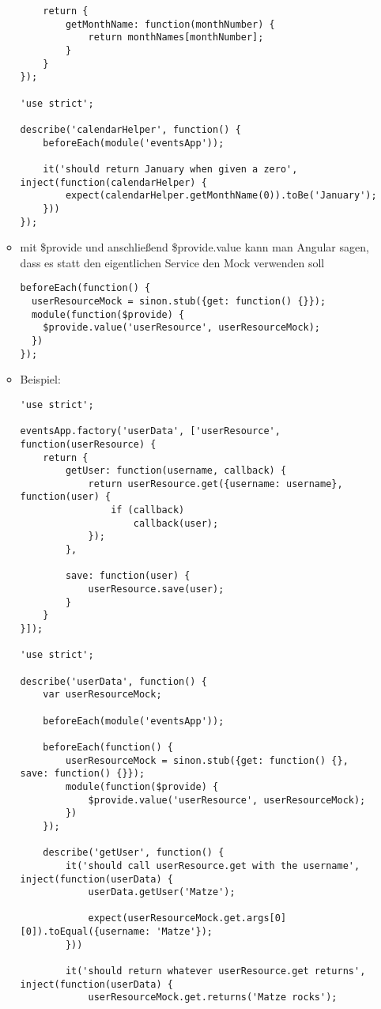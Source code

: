 \begin{itemize}
\begin{itemize}
\begin{verbatim}
    return {
        getMonthName: function(monthNumber) {
            return monthNames[monthNumber];
        }
    }
});

'use strict';

describe('calendarHelper', function() {
    beforeEach(module('eventsApp'));

    it('should return January when given a zero', inject(function(calendarHelper) {
        expect(calendarHelper.getMonthName(0)).toBe('January');
    }))
});
        \end{verbatim}
      \item mit \$provide und anschließend \$provide.value kann man Angular sagen, dass es statt den eigentlichen Service den Mock
        verwenden soll
        \begin{verbatim}
beforeEach(function() {
  userResourceMock = sinon.stub({get: function() {}});
  module(function($provide) {
    $provide.value('userResource', userResourceMock);
  })
});
        \end{verbatim}
      \item Beispiel:
        \begin{verbatim}
'use strict';

eventsApp.factory('userData', ['userResource', function(userResource) {
    return {
        getUser: function(username, callback) {
            return userResource.get({username: username}, function(user) {
                if (callback)
                    callback(user);
            });
        },

        save: function(user) {
            userResource.save(user);
        }
    }
}]);

'use strict';

describe('userData', function() {
    var userResourceMock;

    beforeEach(module('eventsApp'));

    beforeEach(function() {
        userResourceMock = sinon.stub({get: function() {}, save: function() {}});
        module(function($provide) {
            $provide.value('userResource', userResourceMock);
        })
    });

    describe('getUser', function() {
        it('should call userResource.get with the username', inject(function(userData) {
            userData.getUser('Matze');

            expect(userResourceMock.get.args[0][0]).toEqual({username: 'Matze'});
        }))

        it('should return whatever userResource.get returns', inject(function(userData) {
            userResourceMock.get.returns('Matze rocks');


\end{verbatim}
\end{itemize}
\end{itemize}

